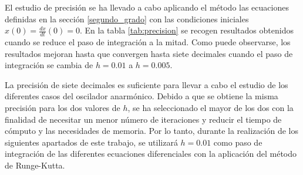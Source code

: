\documentclass[11pt]{article}
\begin{document}
El estudio de precisión se ha llevado a cabo aplicando el método las ecuaciones
definidas en la sección \ref{segundo_grado} con las condiciones iniciales
$x(0) = \frac{dx}{dt}(0) = 0$. En la tabla \ref{tab:precision} se recogen
resultados obtenidos cuando se reduce el paso de integración a la mitad. Como
puede observarse, los resultados mejoran hasta que convergen hasta siete
decimales cuando el paso de integración se cambia de $h = 0.01$ a $h=0.005$. 

La precisión de siete decimales es suficiente para llevar a cabo el estudio de
los diferentes casos del oscilador anarmónico. Debido a que se obtiene la misma
precisión para los dos valores de $h$, se ha seleccionado el mayor de los dos
con la finalidad de necesitar un menor número de iteraciones y reducir el tiempo
de cómputo y las necesidades de memoria. Por lo tanto, durante la realización de
los siguientes apartados de este trabajo, se utilizará $h = 0.01$ como paso de
integración de las diferentes ecuaciones diferenciales con la aplicación del
método de Runge-Kutta.  
\end{document}

